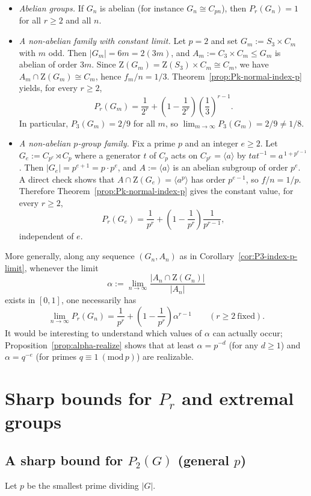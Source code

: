 \documentclass[11pt]{article}
\theoremstyle{definition}
\theoremstyle{remark}
\theoremstyle{definition}
\theoremstyle{plain}
\newcommand{\Z}{\mathrm{Z}}
\begin{document}
\begin{itemize}
\item \emph{Abelian groups.} If $G_n$ is abelian (for instance $G_n\cong C_{pn}$), then $P_r(G_n)=1$ for all $r\ge 2$ and all $n$.

\item \emph{A non-abelian family with constant limit.} Let $p=2$ and set $G_m:=S_3\times C_m$ with $m$ odd.
Then $|G_m|=6m=2(3m)$, and $A_m:=C_3\times C_m\le G_m$ is abelian of order $3m$.
Since $\Z(G_m)=\Z(S_3)\times C_m\cong C_m$, we have $A_m\cap \Z(G_m)\cong C_m$, hence $f_m/n=1/3$.
Theorem~\ref{prop:Pk-normal-index-p} yields, for every $r\ge 2$,
\[
P_r(G_m)
=\frac{1}{2^r}+\left(1-\frac{1}{2^r}\right)\left(\frac13\right)^{r-1}.
\]
In particular, $P_3(G_m)=2/9$ for all $m$, so $\lim_{m\to\infty}P_3(G_m)=2/9\neq 1/8$.

\item \emph{A non-abelian $p$-group family.} Fix a prime $p$ and an integer $e\ge 2$.
Let $G_e:=C_{p^e}\rtimes C_p$ where a generator $t$ of $C_p$ acts on $C_{p^e}=\langle a\rangle$ by
$t a t^{-1}=a^{\,1+p^{e-1}}$.
Then $|G_e|=p^{e+1}=p\cdot p^e$, and $A:=\langle a\rangle$ is an abelian subgroup of order $p^e$.
A direct check shows that $A\cap \Z(G_e)=\langle a^p\rangle$ has order $p^{e-1}$, so $f/n=1/p$.
Therefore Theorem~\ref{prop:Pk-normal-index-p} gives the constant value, for every $r\ge 2$,
\[
P_r(G_e)=\frac{1}{p^r}+\left(1-\frac{1}{p^r}\right)\frac{1}{p^{r-1}},
\]
independent of $e$.
\end{itemize}

\noindent More generally, along any sequence $(G_n,A_n)$ as in Corollary~\ref{cor:P3-index-p-limit}, whenever the limit
\[
\alpha:=\lim_{n\to\infty}\frac{|A_n\cap \Z(G_n)|}{|A_n|}
\]
exists in $[0,1]$, one necessarily has
\[
\lim_{n\to\infty}P_r(G_n)
=\frac{1}{p^r}+\left(1-\frac{1}{p^r}\right)\alpha^{r-1}
\qquad (r\ge 2\ \text{fixed}).
\]
It would be interesting to understand which values of $\alpha$ can actually occur; Proposition~\ref{prop:alpha-realize}
shows that at least $\alpha=p^{-d}$ (for any $d\ge 1$) and $\alpha=q^{-e}$ (for primes $q\equiv 1\ (\mathrm{mod}\,p)$) are realizable.

\section{Sharp bounds for \texorpdfstring{$P_r$}{Pr} and extremal groups}\label{sec:bounds}

\subsection{A sharp bound for \texorpdfstring{$P_2(G)$}{P2(G)} (general \texorpdfstring{$p$}{p})}
Let $p$ be the smallest prime dividing $|G|$.
\end{document}
